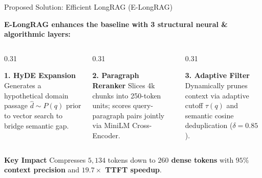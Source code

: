 \documentclass[10pt,aspectratio=169]{beamer}
\begin{document}
\begin{frame}{Proposed Solution: Efficient LongRAG (E-LongRAG)}
    \begin{center}
        \textbf{E-LongRAG enhances the baseline with 3 structural neural \& algorithmic layers:}
    \end{center}
    
    \vspace{0.15cm}
    \begin{columns}[onlytextwidth,T]
        \begin{column}{0.31\textwidth}
            \begin{block}{\textbf{1. HyDE Expansion}}
                \footnotesize
                Generates a hypothetical domain passage $\hat{d} \sim P(q)$ prior to vector search to bridge semantic gap.
            \end{block}
        \end{column}
        
        \begin{column}{0.31\textwidth}
            \begin{block}{\textbf{2. Paragraph Reranker}}
                \footnotesize
                Slices 4k chunks into 250-token units; scores query-paragraph pairs jointly via MiniLM Cross-Encoder.
            \end{block}
        \end{column}
        
        \begin{column}{0.31\textwidth}
            \begin{block}{\textbf{3. Adaptive Filter}}
                \footnotesize
                Dynamically prunes context via adaptive cutoff $\tau(q)$ and semantic cosine deduplication ($\delta = 0.85$).
            \end{block}
        \end{column}
    \end{columns}

    \vspace{0.25cm}
    \begin{alertblock}{\textbf{Key Impact}}
        Compresses $5,134$ tokens down to \textbf{$260$ dense tokens} with \textbf{$95\%$ context precision} and \textbf{$19.7\times$ TTFT speedup}.
    \end{alertblock}
\end{frame}
\end{document}
